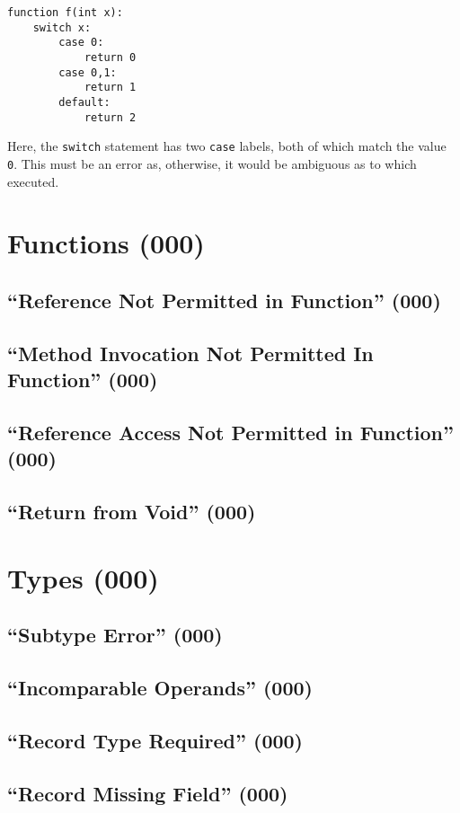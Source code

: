 \begin{lstlisting}
function f(int x):
    switch x:
        case 0:
            return 0
        case 0,1:
            return 1
        default:
            return 2
\end{lstlisting}

Here, the \lstinline{switch} statement has two \lstinline{case} labels, both of which match the value \lstinline{0}.  This must be an error as, otherwise, it would be ambiguous as to which executed.

\section{Functions (000)}

\subsection{``Reference Not Permitted in Function'' (000)}

\subsection{``Method Invocation Not Permitted In Function'' (000)}

\subsection{``Reference Access Not Permitted in Function'' (000)}

\subsection{``Return from Void'' (000)}
	
\section{Types (000)}

\subsection{``Subtype Error'' (000)}

\subsection{``Incomparable Operands'' (000)}

\subsection{``Record Type Required'' (000)}

\subsection{``Record Missing Field'' (000)}

